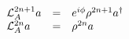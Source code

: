 \begin{equation}
  \begin{array}{lcl}
{\cal L}_A^{2n+1} a &=&  e^{i\phi} \rho^{2n+1}a^\dagger \\
{\cal L}_A^{2n} a &=&  \rho^{2n}a \\
  \end{array}
\end{equation}

